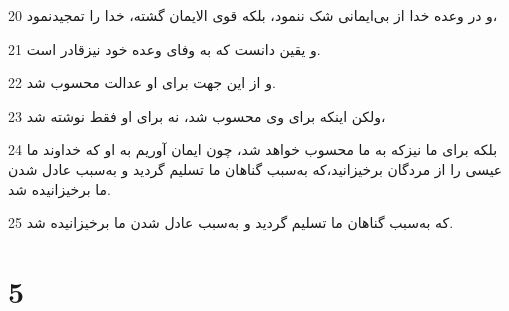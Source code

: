 \par 20 و در وعده خدا از بی‌ایمانی شک ننمود، بلکه قوی الایمان گشته، خدا را تمجیدنمود،
\par 21 و یقین دانست که به وفای وعده خود نیزقادر است.
\par 22 و از این جهت برای او عدالت محسوب شد.
\par 23 ولکن اینکه برای وی محسوب شد، نه برای او فقط نوشته شد،
\par 24 بلکه برای ما نیزکه به ما محسوب خواهد شد، چون ایمان آوریم به او که خداوند ما عیسی را از مردگان برخیزانید،که به‌سبب گناهان ما تسلیم گردید و به‌سبب عادل شدن ما برخیزانیده شد.
\par 25 که به‌سبب گناهان ما تسلیم گردید و به‌سبب عادل شدن ما برخیزانیده شد.

\chapter{5}

